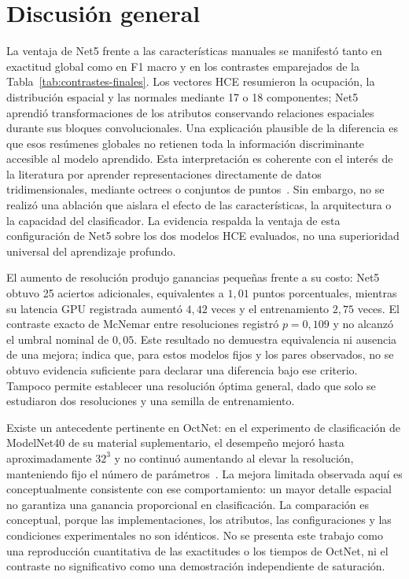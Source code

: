\section{Discusión general}
\label{sec:discusion-general}
La ventaja de Net5 frente a las características manuales se manifestó tanto en exactitud global como en F1 macro y en los contrastes emparejados de la Tabla~\ref{tab:contrastes-finales}. Los vectores HCE resumieron la ocupación, la distribución espacial y las normales mediante 17 o 18 componentes; Net5 aprendió transformaciones de los atributos conservando relaciones espaciales durante sus bloques convolucionales. Una explicación plausible de la diferencia es que esos resúmenes globales no retienen toda la información discriminante accesible al modelo aprendido. Esta interpretación es coherente con el interés de la literatura por aprender representaciones directamente de datos tridimensionales, mediante octrees o conjuntos de puntos~\parencite{riegler2017,qi2017}. Sin embargo, no se realizó una ablación que aislara el efecto de las características, la arquitectura o la capacidad del clasificador. La evidencia respalda la ventaja de esta configuración de Net5 sobre los dos modelos HCE evaluados, no una superioridad universal del aprendizaje profundo.

El aumento de resolución produjo ganancias pequeñas frente a su costo: Net5 obtuvo 25 aciertos adicionales, equivalentes a $1{,}01$ puntos porcentuales, mientras su latencia GPU registrada aumentó $4{,}42$ veces y el entrenamiento $2{,}75$ veces. El contraste exacto de McNemar entre resoluciones registró $p=0{,}109$ y no alcanzó el umbral nominal de $0{,}05$. Este resultado no demuestra equivalencia ni ausencia de una mejora; indica que, para estos modelos fijos y los pares observados, no se obtuvo evidencia suficiente para declarar una diferencia bajo ese criterio. Tampoco permite establecer una resolución óptima general, dado que solo se estudiaron dos resoluciones y una semilla de entrenamiento.

Existe un antecedente pertinente en OctNet: en el experimento de clasificación de ModelNet40 de su material suplementario, el desempeño mejoró hasta aproximadamente $32^3$ y no continuó aumentando al elevar la resolución, manteniendo fijo el número de parámetros~\parencite{riegler2017}. La mejora limitada observada aquí es conceptualmente consistente con ese comportamiento: un mayor detalle espacial no garantiza una ganancia proporcional en clasificación. La comparación es conceptual, porque las implementaciones, los atributos, las configuraciones y las condiciones experimentales no son idénticos. No se presenta este trabajo como una reproducción cuantitativa de las exactitudes o los tiempos de OctNet, ni el contraste no significativo como una demostración independiente de saturación.

